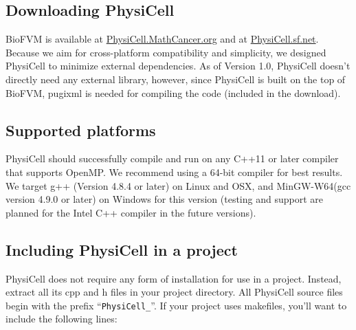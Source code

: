 \documentclass[11pt]{article}
\begin{document}
\subsection{Downloading PhysiCell}
BioFVM is available at \href{http://PhysiCell.MathCancer.org}{PhysiCell.MathCancer.org} and at \href{http://PhysiCell.sf.net}{PhysiCell.sf.net}.
Because we aim for cross-platform compatibility and simplicity, we designed PhysiCell
to minimize external dependencies.  As of Version 1.0, PhysiCell doesn't directly need any external library, however, since PhysiCell is built on the top of BioFVM, pugixml is needed for compiling the code (included in the download).

\subsection{Supported platforms}
PhysiCell should successfully compile and run on any C++11 or later compiler that supports OpenMP.
We recommend using a 64-bit compiler for best results. We target g++ (Version 4.8.4 or later)
on Linux and OSX, and MinGW-W64(gcc version 4.9.0 or later) on Windows for this version (testing and support are planned
for the Intel C++ compiler in the future versions).

\subsection{Including PhysiCell in a project}
\label{including_PhysiCell}
PhysiCell does not require any form of installation for use in a project. Instead, extract all
its cpp and h files in your project directory. All PhysiCell source files begin with the prefix
``\verb:PhysiCell_:''. If your project uses makefiles, you'll want to include
the following lines:
\end{document}
